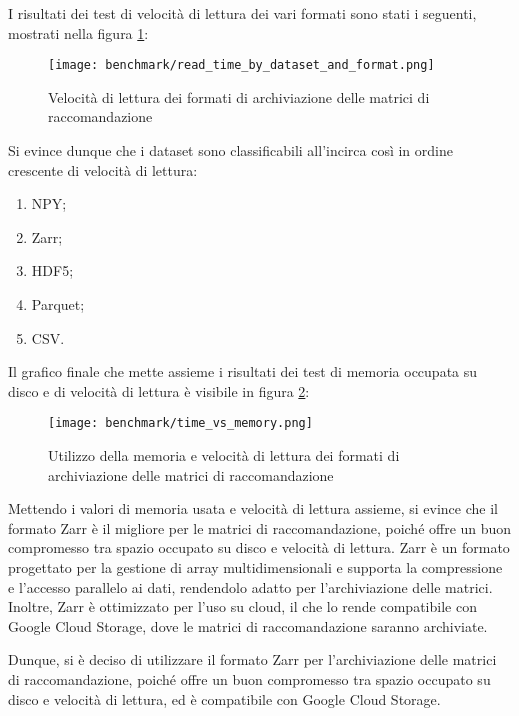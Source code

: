 I risultati dei test di velocità di lettura dei vari formati sono stati i seguenti, mostrati nella figura \ref{fig:read-speed-recommendation-matrices}:

\newpage

\begin{figure}[!h]
    \centering
    \texttt{[image: benchmark/read\_time\_by\_dataset\_and\_format.png]}
    \caption{Velocità di lettura dei formati di archiviazione delle matrici di raccomandazione}
    \label{fig:read-speed-recommendation-matrices}
\end{figure}

Si evince dunque che i dataset sono classificabili all'incirca così in ordine crescente di velocità di lettura:
\begin{enumerate}
    \item NPY;
    \item Zarr;
    \item HDF5;
    \item Parquet;
    \item CSV.
\end{enumerate}

Il grafico finale che mette assieme i risultati dei test di memoria occupata su disco e di velocità di lettura è visibile in figura \ref{fig:memory-usage-and-read-speed-recommendation-matrices}:

\newpage

\begin{figure}[!h]
    \centering
    \texttt{[image: benchmark/time\_vs\_memory.png]}
    \caption{Utilizzo della memoria e velocità di lettura dei formati di archiviazione delle matrici di raccomandazione}
    \label{fig:memory-usage-and-read-speed-recommendation-matrices}
\end{figure}

Mettendo i valori di memoria usata e velocità di lettura assieme, si evince che il formato Zarr è il migliore per le matrici di raccomandazione, poiché offre un buon compromesso tra spazio occupato su disco e velocità di lettura. Zarr è un formato progettato per la gestione di array multidimensionali e supporta la compressione e l'accesso parallelo ai dati, rendendolo adatto per l'archiviazione delle matrici. Inoltre, Zarr è ottimizzato per l'uso su cloud, il che lo rende compatibile con Google Cloud Storage, dove le matrici di raccomandazione saranno archiviate.

Dunque, si è deciso di utilizzare il formato Zarr per l'archiviazione delle matrici di raccomandazione, poiché offre un buon compromesso tra spazio occupato su disco e velocità di lettura, ed è compatibile con Google Cloud Storage.


